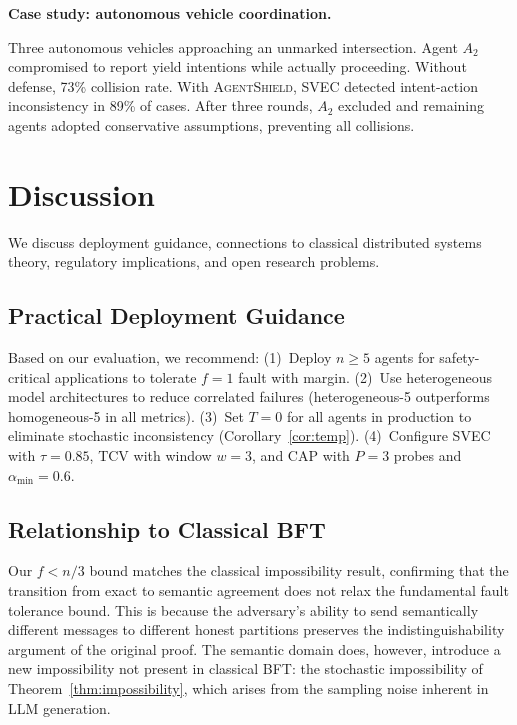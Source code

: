 \documentclass[journal,10pt]{IEEEtran}
\begin{document}
\textbf{Case study: autonomous vehicle coordination.}

Three autonomous vehicles approaching an unmarked intersection. Agent $A_2$ compromised to report yield intentions while actually proceeding. Without defense, 73\% collision rate. With \textsc{AgentShield}, SVEC detected intent-action inconsistency in 89\% of cases. After three rounds, $A_2$ excluded and remaining agents adopted conservative assumptions, preventing all collisions.

\section{Discussion}\label{sec:discussion}
We discuss deployment guidance, connections to classical distributed systems theory, regulatory implications, and open research problems.

\subsection{Practical Deployment Guidance}
Based on our evaluation, we recommend: (1)~Deploy $n \geq 5$ agents for safety-critical applications to tolerate $f = 1$ fault with margin. (2)~Use heterogeneous model architectures to reduce correlated failures (heterogeneous-5 outperforms homogeneous-5 in all metrics). (3)~Set $T = 0$ for all agents in production to eliminate stochastic inconsistency (Corollary~\ref{cor:temp}). (4)~Configure SVEC with $\tau = 0.85$, TCV with window $w = 3$, and CAP with $P = 3$ probes and $\alpha_{\min} = 0.6$.

\subsection{Relationship to Classical BFT}
Our $f < n/3$ bound matches the classical impossibility result, confirming that the transition from exact to semantic agreement does not relax the fundamental fault tolerance bound. This is because the adversary's ability to send semantically different messages to different honest partitions preserves the indistinguishability argument of the original proof. The semantic domain does, however, introduce a new impossibility not present in classical BFT: the stochastic impossibility of Theorem~\ref{thm:impossibility}, which arises from the sampling noise inherent in LLM generation.
\end{document}
